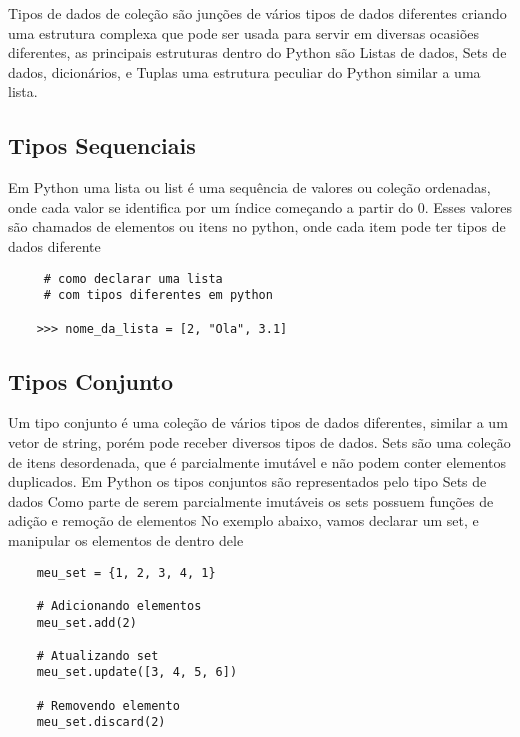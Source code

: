     Tipos de dados de coleção são junções de vários tipos de dados diferentes criando uma estrutura complexa que pode ser usada para servir em diversas ocasiões diferentes, as principais estruturas dentro do Python são Listas de dados, Sets de dados, dicionários, e Tuplas uma estrutura peculiar do Python similar a uma lista.  \\

    \subsection{Tipos Sequenciais}
            Em Python uma lista ou list é uma sequência de valores ou coleção ordenadas, onde cada valor se identifica por um índice começando a partir do 0.
            Esses valores são chamados de elementos ou itens no python, onde cada item pode ter tipos de dados diferente \\
            
    \begin{lstlisting}
     # como declarar uma lista 
     # com tipos diferentes em python
    
    >>> nome_da_lista = [2, "Ola", 3.1]
    \end{lstlisting}
        

            \subsection{Tipos Conjunto}
            Um tipo conjunto é uma coleção de vários tipos de dados diferentes, similar a um vetor de string, porém pode receber diversos tipos de dados. Sets são uma coleção de itens desordenada, que é parcialmente imutável e não podem conter elementos duplicados. Em Python os tipos conjuntos são representados pelo tipo Sets de dados
            Como parte de serem parcialmente imutáveis os sets possuem funções de adição e remoção de elementos
            No exemplo abaixo, vamos declarar um set, e manipular os elementos de dentro dele
        
    \begin{lstlisting}
    meu_set = {1, 2, 3, 4, 1}
    
    # Adicionando elementos
    meu_set.add(2)
    
    # Atualizando set
    meu_set.update([3, 4, 5, 6])
    
    # Removendo elemento
    meu_set.discard(2)

    \end{lstlisting}
        
